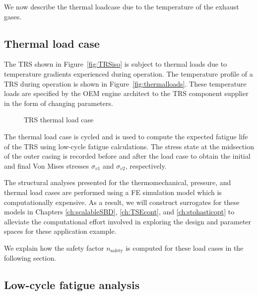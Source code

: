 We now describe the thermal loadcase due to the temperature of the exhaust gases.

\subsection{Thermal load case} \label{subsec:thermalloadcase}

The \ac{TRS} shown in Figure~\ref{fig:TRSiso} is subject to thermal loads due to temperature gradients experienced during operation. The temperature profile of a \ac{TRS} during operation is shown in Figure~\ref{fig:thermalloads}. These temperature loads are specified by the \ac{OEM} engine architect to the \ac{TRS} component supplier in the form of changing parameters.

\begin{figure}[h!]
	\centering
	 \hspace{0.1\textwidth}%
	\caption{\ac{TRS} thermal load case}
	\label{fig:thermalloadcases}
\end{figure}

The thermal load case is cycled and is used to compute the expected fatigue life of the \ac{TRS} using low-cycle fatigue calculations. The stress state at the midsection of the outer casing is recorded before and after the load case to obtain the initial and final Von Mises stresses $\sigma_{v1}$ and $\sigma_{v2}$, respectively.

The structural analyses presented for the thermomechanical, pressure, and thermal load cases are performed using a \ac{FE} simulation model which is computationally expensive. As a result, we will construct surrogates for these models in Chapters \ref{ch:scalableSBD}, \ref{ch:TSEcont}, and \ref{ch:stohasticopt} to alleviate the computational effort involved in exploring the design and parameter spaces for these application example.

We explain how the safety factor $n_{\textrm{safety}}$ is computed for these load cases in the following section.

\subsection{Low-cycle fatigue analysis} \label{subsec:fatigueanalysis}

